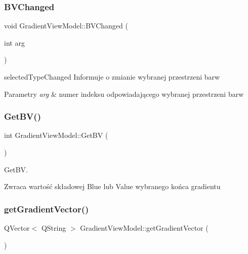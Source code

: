 \subsubsection{\texorpdfstring{B\+V\+Changed}{BVChanged}}
{\footnotesize\ttfamily void Gradient\+View\+Model\+::\+B\+V\+Changed (\begin{DoxyParamCaption}\item[{int}]{arg }\end{DoxyParamCaption})\hspace{0.3cm}{\ttfamily [signal]}}



selected\+Type\+Changed Informuje o zmianie wybranej przestrzeni barw 


\begin{DoxyParams}{Parametry}
{\em arg} & numer indeksu odpowiadającego wybranej przestrzeni barw \\
\hline
\end{DoxyParams}
\mbox{\label{class_gradient_view_model_ac3643df9744d6672719c7d15d9d8a544}} 
\subsubsection{\texorpdfstring{Get\+B\+V()}{GetBV()}}
{\footnotesize\ttfamily int Gradient\+View\+Model\+::\+Get\+BV (\begin{DoxyParamCaption}{ }\end{DoxyParamCaption})}



Get\+BV. 

\begin{DoxyReturn}{Zwraca}
wartość składowej Blue lub Value wybranego końca gradientu 
\end{DoxyReturn}
\mbox{\label{class_gradient_view_model_a267819ee342ee0d7b8d59a07eca2f44a}} 
\subsubsection{\texorpdfstring{get\+Gradient\+Vector()}{getGradientVector()}}
{\footnotesize\ttfamily Q\+Vector$<$ Q\+String $>$ Gradient\+View\+Model\+::get\+Gradient\+Vector (\begin{DoxyParamCaption}{ }\end{DoxyParamCaption})}



